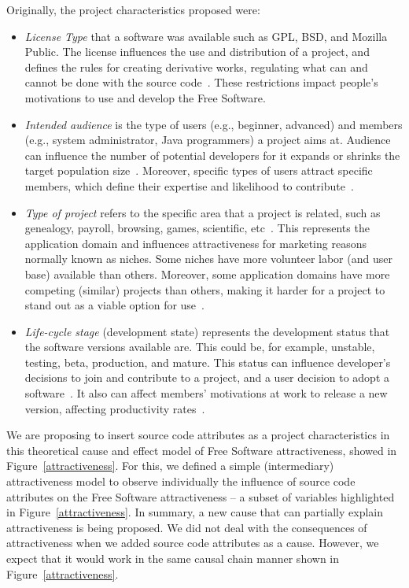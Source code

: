 \documentclass[conference]{IEEEtran}
\begin{document}
Originally, the project characteristics proposed were:
\begin{itemize}
%
\item \emph{License Type} that a software was available such as GPL, BSD, 
and Mozilla Public.
%
The license influences the use and distribution of a project, and defines the rules for 
creating derivative works, regulating what can and cannot be done with the
source code~\cite{Santos2010}. These restrictions impact people's motivations
to use and develop the Free Software.

%
\item \emph{Intended audience} is the type of users (e.g., beginner, advanced)
and members (e.g., system administrator, Java programmers) a project aims at.
%
Audience can influence the number of potential developers for it expands or
shrinks the target population size~\cite{johnson2002}.
%
Moreover, specific types of users attract specific members, which define their expertise
and likelihood to contribute~\cite{Santos2010}.

%
\item \emph{Type of project} refers to the specific area that a project is related, 
such as genealogy, payroll, browsing, games, scientific, etc~\cite{Crowston2002}.
%
This represents the application domain and influences attractiveness for
marketing reasons normally known as niches.
%
Some niches have more volunteer labor (and user base) available than others.
%
Moreover, some application domains have more competing (similar) projects than
others, making it harder for a project to stand out as a viable option for
use~\cite{johnson2002}.
%
\item \emph{Life-cycle stage} (development state) represents the development
status that the software versions available are. 
%
This could be, for example, unstable, testing, beta, production, and mature.
%
This status can influence developer's decisions to join and contribute to a
project, and a user decision to adopt a software~\cite{Santos2010}.
%
It also can affect members' motivations at work to release a new version,
affecting productivity rates~\cite{raja2006,Stewart2006}. 

\end{itemize}

We are proposing to insert source code attributes as a project
characteristics in this theoretical cause and effect model of Free Software
attractiveness, showed in Figure~\ref{attractiveness}.
%
For this, we defined a simple (intermediary) attractiveness model
to observe individually the influence of source code attributes on the Free
Software attractiveness -- a subset of variables highlighted in
Figure~\ref{attractiveness}.
%
In summary, a new cause that can partially explain attractiveness is being proposed.
%
We did not deal with the consequences of attractiveness when we added source
code attributes as a cause.
%
However, we expect that it would work in the same causal chain manner
shown in Figure~\ref{attractiveness}.
\end{document}
